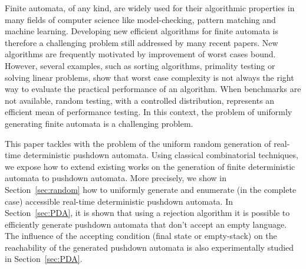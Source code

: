 


Finite automata, of any kind, are widely used for their algorithmic
properties in many fields of computer science like model-checking,
pattern matching and machine learning. Developing new efficient algorithms
for finite automata is therefore a challenging problem still addressed by
many recent papers. New algorithms are frequently motivated by improvement
of worst cases bound. However, several examples, such as sorting algorithms,
primality testing or solving linear problems, show that worst case
complexity is not always the right way to evaluate the practical performance
of an algorithm. When benchmarks are not available, random testing, with a
controlled distribution, represents an efficient mean of performance
testing. In this context, the problem of uniformly generating finite
automata is a challenging problem.


This paper tackles with the problem of the uniform random generation of
real-time deterministic pushdown automata. Using classical combinatorial
techniques, we expose how to extend existing works on the generation of
finite deterministic automata to pushdown automata. More precisely, we show
in Section~\ref{sec:random} how to uniformly generate and enumerate (in the
complete case) accessible real-time deterministic pushdown automata. In
Section~\ref{sec:PDA}, it is shown that using a rejection algorithm it is
possible to efficiently generate pushdown automata that don't accept an
empty language. The influence of the accepting condition (final state or
empty-stack) on the reachability
of the generated pushdown automata is also experimentally studied  in
Section~\ref{sec:PDA}.



